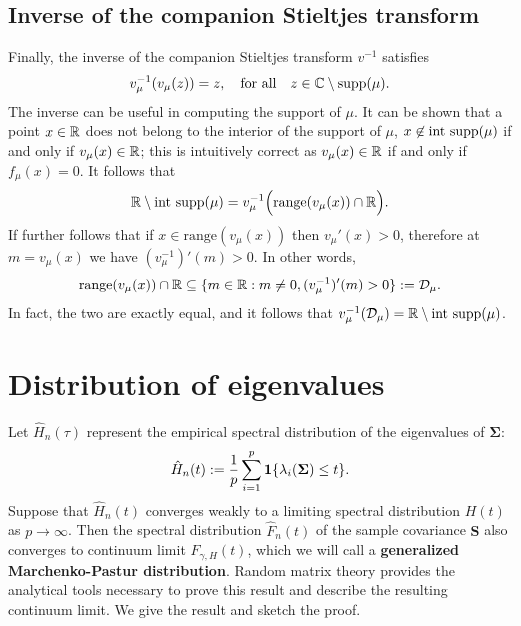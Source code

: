 \documentclass{article}
\newcommand{\bSigma}{\boldsymbol{\Sigma}}
\newcommand{\bS}{\boldsymbol{S}}
\begin{document}
\subsection{Inverse of the companion Stieltjes transform}
\label{sec:inverse-companion-transform}

Finally, the inverse of the companion Stieltjes transform $v^{-1}$ satisfies
$$
v_{\mu}^{-1}(v_{\mu}(z)) = z, \quad \textrm{for all}\quad z \in \mathbb{C}\setminus\mathrm{supp}(\mu).
$$
The inverse can be useful in computing the support of $\mu$. It can be shown that a point $x \in \mathbb{R}$ does not belong to the interior of the support of $\mu$, $x \not\in \mathrm{int}~\mathrm{supp}(\mu)$ if and only if $v_{\mu}(x) \in \mathbb{R}$; this is intuitively correct as $v_{\mu}(x) \in \mathbb{R}$ if and only if $f_{\mu}(x) = 0$. It follows that 
$$
\mathbb{R} \setminus \mathrm{int}~\mathrm{supp}(\mu) = v_{\mu}^{-1}\Big(\mathrm{range}(v_{\mu}(x)) \cap \mathbb{R}\Big).
$$
If further follows that if $x \in \mathrm{range}(v_{\mu}(x))$ then $v_{\mu}'(x) > 0$, therefore at $m = v_{\mu}(x)$ we have $(v_{\mu}^{-1})'(m) > 0$. In other words, 
$$
\mathrm{range}(v_{\mu}(x)) \cap \mathbb{R} \subseteq \{m \in \mathbb{R}: m \neq 0, (v_{\mu}^{-1})'(m) > 0 \} := \mathcal{D}_{\mu}.
$$
In fact, the two are exactly equal, and it follows that $v_{\mu}^{-1}(\mathcal{D}_{\mu}) = \mathbb{R} \setminus \mathrm{int}~\mathrm{supp}(\mu)$.




\section{Distribution of eigenvalues}
Let $\hat{H}_n(\tau)$ represent the empirical spectral distribution of the eigenvalues of $\bSigma$:
$$
\hat{H}_n(t) := \frac{1}{p} \sum_{i = 1}^{p} \1\{\lambda_i(\bSigma) \leq t\}.
$$
Suppose that $\hat{H}_n(t)$ converges weakly to a limiting spectral distribution $H(t)$ as $p \to \infty$. Then the spectral distribution $\hat{F}_n(t)$ of the sample covariance $\bS$ also converges to continuum limit $F_{\gamma,H}(t)$, which we will call a {\bf generalized Marchenko-Pastur distribution}. Random matrix theory provides the analytical tools necessary to prove this result and describe the resulting continuum limit. We give the result and sketch the proof.
\end{document}
